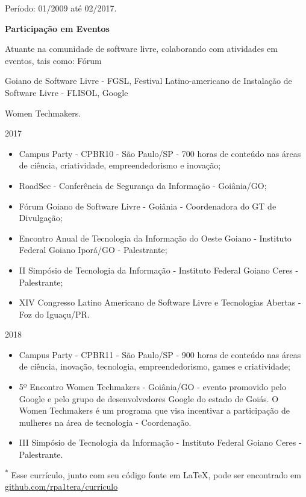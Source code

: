 \documentclass[a4paper,10pt]{report}
\begin{document}
Período: 01/2009 até 02/2017. 	



\vspace{1em}
\vspace{1em}
\textbf{\large{Participação em Eventos}}
\newline

Atuante na comunidade de software livre, colaborando com atividades em eventos, tais como: 
Fórum 

Goiano de Software Livre - FGSL, Festival Latino-americano de Instalação de Software Livre - FLISOL, Google 

Women Techmakers.
\newline

2017

\begin{itemize}
\addtolength{\baselineskip}{-1\baselineskip}

 \item Campus Party - CPBR10 - São Paulo/SP - 700 horas de conteúdo nas áreas de ciência, criatividade, empreendedorismo e inovação;

 \item RoadSec - Conferência de Segurança da Informação - Goiânia/GO;

 \item Fórum Goiano de Software Livre - Goiânia - Coordenadora do GT de Divulgação;

 \item Encontro Anual de Tecnologia da Informação do Oeste Goiano - Instituto Federal Goiano Iporá/GO - Palestrante;

 \item II Simpósio de Tecnologia da Informação - Instituto Federal Goiano Ceres - Palestrante;
 
 \item XIV Congresso Latino Americano de Software Livre e Tecnologias Abertas - Foz do Iguaçu/PR.
\end{itemize}

2018
\begin{itemize}
 \item Campus Party - CPBR11 - São Paulo/SP - 900 horas de conteúdo nas áreas de ciência, inovação, tecnologia, empreendedorismo, games e criatividade;
 \item 5º Encontro Women Techmakers - Goiânia/GO - evento promovido pelo Google e pelo grupo de desenvolvedores Google do estado de Goiás.  O Women Techmakers é um programa que visa incentivar a participação de mulheres na área de tecnologia - Coordenação.
 \item III Simpósio de Tecnologia da Informação - Instituto Federal Goiano Ceres - Palestrante.
\end{itemize}

\vfill
\hrulefill

\begin{footnotesize}
\textsuperscript{$\ast$} Esse currículo, junto com seu código fonte em \LaTeX, pode ser encontrado em \href{https://github.com/rpa1tera/curriculo}{github.com/rpa1tera/curriculo}
\end{footnotesize}
\end{document}
